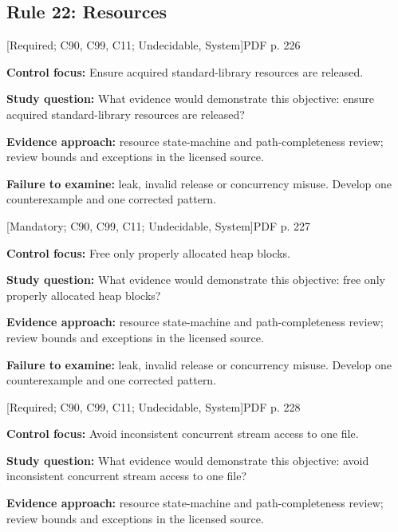 \documentclass[10pt,letterpaper]{article}
\begin{document}
\subsection{Rule 22: Resources}
 \textsf{\footnotesize [Required; C90, C99, C11; Undecidable, System]}\hfill{\footnotesize PDF p. 226}\par
\textbf{Control focus:} Ensure acquired standard-library resources are released.\par
\textbf{Study question:} What evidence would demonstrate this objective: ensure acquired standard-library resources are released?\par
\textbf{Evidence approach:} resource state-machine and path-completeness review; review bounds and exceptions in the licensed source.\par
\textbf{Failure to examine:} leak, invalid release or concurrency misuse. Develop one counterexample and one corrected pattern.\par
\smallskip
{}
 \textsf{\footnotesize [Mandatory; C90, C99, C11; Undecidable, System]}\hfill{\footnotesize PDF p. 227}\par
\textbf{Control focus:} Free only properly allocated heap blocks.\par
\textbf{Study question:} What evidence would demonstrate this objective: free only properly allocated heap blocks?\par
\textbf{Evidence approach:} resource state-machine and path-completeness review; review bounds and exceptions in the licensed source.\par
\textbf{Failure to examine:} leak, invalid release or concurrency misuse. Develop one counterexample and one corrected pattern.\par
\smallskip
{}
 \textsf{\footnotesize [Required; C90, C99, C11; Undecidable, System]}\hfill{\footnotesize PDF p. 228}\par
\textbf{Control focus:} Avoid inconsistent concurrent stream access to one file.\par
\textbf{Study question:} What evidence would demonstrate this objective: avoid inconsistent concurrent stream access to one file?\par
\textbf{Evidence approach:} resource state-machine and path-completeness review; review bounds and exceptions in the licensed source.\par
\end{document}
